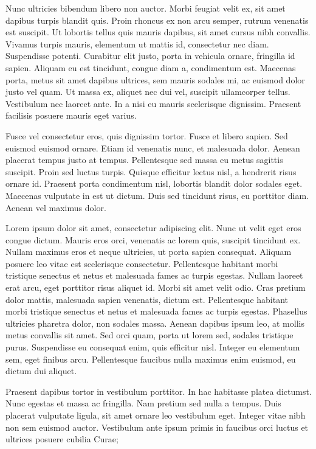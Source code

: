\documentclass{article}
\begin{document}
Nunc ultricies bibendum libero non auctor. Morbi feugiat velit ex, sit amet dapibus turpis blandit quis. Proin rhoncus ex non arcu semper, rutrum venenatis est suscipit. Ut lobortis tellus quis mauris dapibus, sit amet cursus nibh convallis. Vivamus turpis mauris, elementum ut mattis id, consectetur nec diam. Suspendisse potenti. Curabitur elit justo, porta in vehicula ornare, fringilla id sapien. Aliquam eu est tincidunt, congue diam a, condimentum est. Maecenas porta, metus sit amet dapibus ultrices, sem mauris sodales mi, ac euismod dolor justo vel quam. Ut massa ex, aliquet nec dui vel, suscipit ullamcorper tellus. Vestibulum nec laoreet ante. In a nisi eu mauris scelerisque dignissim. Praesent facilisis posuere mauris eget varius.

Fusce vel consectetur eros, quis dignissim tortor. Fusce et libero sapien. Sed euismod euismod ornare. Etiam id venenatis nunc, et malesuada dolor. Aenean placerat tempus justo at tempus. Pellentesque sed massa eu metus sagittis suscipit. Proin sed luctus turpis. Quisque efficitur lectus nisl, a hendrerit risus ornare id. Praesent porta condimentum nisl, lobortis blandit dolor sodales eget. Maecenas vulputate in est ut dictum. Duis sed tincidunt risus, eu porttitor diam. Aenean vel maximus dolor.


Lorem ipsum dolor sit amet, consectetur adipiscing elit. Nunc ut velit eget eros congue dictum. Mauris eros orci, venenatis ac lorem quis, suscipit tincidunt ex. Nullam maximus eros et neque ultricies, ut porta sapien consequat. Aliquam posuere leo vitae est scelerisque consectetur. Pellentesque habitant morbi tristique senectus et netus et malesuada fames ac turpis egestas. Nullam laoreet erat arcu, eget porttitor risus aliquet id. Morbi sit amet velit odio. Cras pretium dolor mattis, malesuada sapien venenatis, dictum est. Pellentesque habitant morbi tristique senectus et netus et malesuada fames ac turpis egestas. Phasellus ultricies pharetra dolor, non sodales massa. Aenean dapibus ipsum leo, at mollis metus convallis sit amet. Sed orci quam, porta ut lorem sed, sodales tristique purus. Suspendisse eu consequat enim, quis efficitur nisl. Integer eu elementum sem, eget finibus arcu. Pellentesque faucibus nulla maximus enim euismod, eu dictum dui aliquet.

Praesent dapibus tortor in vestibulum porttitor. In hac habitasse platea dictumst. Nunc egestas et massa ac fringilla. Nam pretium sed nulla a tempus. Duis placerat vulputate ligula, sit amet ornare leo vestibulum eget. Integer vitae nibh non sem euismod auctor. Vestibulum ante ipsum primis in faucibus orci luctus et ultrices posuere cubilia Curae;
\end{document}
